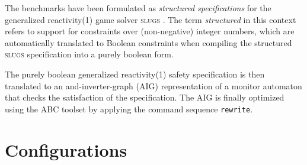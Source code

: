 \documentclass[a4paper,conference,10pt]{IEEEtran}
\begin{document}
\noindent The benchmarks have been formulated as \emph{structured specifications} for the generalized reactivity(1) game solver \textsc{slugs} \cite{SlugsReference}. The term \emph{structured} in this context refers to support for constraints over (non-negative) integer numbers, which are automatically translated to Boolean constraints when compiling the structured \textsc{slugs} specification into a purely boolean form.

The purely boolean generalized reactivity(1) safety specification is then translated to an and-inverter-graph (AIG) representation of a monitor automaton that checks the satisfaction of the specification. The AIG is finally optimized using the ABC toolset \cite{ABCTool} by applying the command sequence \texttt{rewrite}.


\section{Configurations}
\end{document}

